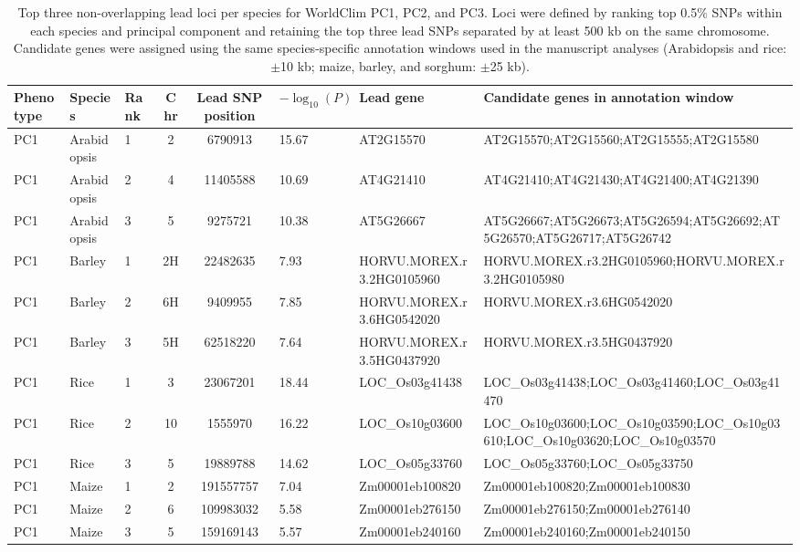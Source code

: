 \begin{table}[t]
\caption{Top three non-overlapping lead loci per species for WorldClim PC1, PC2, and PC3. Loci were defined by ranking top 0.5\% SNPs within each species and principal component and retaining the top three lead SNPs separated by at least 500 kb on the same chromosome. Candidate genes were assigned using the same species-specific annotation windows used in the manuscript analyses (Arabidopsis and rice: $\pm$10 kb; maize, barley, and sorghum: $\pm$25 kb).}
\label{tab:supptable10_worldclim_pc123_top3_loci}
\scriptsize
\tabcolsep=3pt
\begin{tabular*}{\textwidth}{@{\extracolsep{\fill}}lllcclp{3.4cm}p{4.8cm}@{}}
\toprule
Phenotype & Species & Rank & Chr & Lead SNP position & $-\log_{10}(P)$ & Lead gene & Candidate genes in annotation window \\
\midrule
PC1 & Arabidopsis & 1 & 2 & 6790913 & 15.67 & AT2G15570 & AT2G15570;AT2G15560;AT2G15555;AT2G15580 \\
PC1 & Arabidopsis & 2 & 4 & 11405588 & 10.69 & AT4G21410 & AT4G21410;AT4G21430;AT4G21400;AT4G21390 \\
PC1 & Arabidopsis & 3 & 5 & 9275721 & 10.38 & AT5G26667 & AT5G26667;AT5G26673;AT5G26594;AT5G26692;AT5G26570;AT5G26717;AT5G26742 \\
PC1 & Barley & 1 & 2H & 22482635 & 7.93 & HORVU.MOREX.r3.2HG0105960 & HORVU.MOREX.r3.2HG0105960;HORVU.MOREX.r3.2HG0105980 \\
PC1 & Barley & 2 & 6H & 9409955 & 7.85 & HORVU.MOREX.r3.6HG0542020 & HORVU.MOREX.r3.6HG0542020 \\
PC1 & Barley & 3 & 5H & 62518220 & 7.64 & HORVU.MOREX.r3.5HG0437920 & HORVU.MOREX.r3.5HG0437920 \\
PC1 & Rice & 1 & 3 & 23067201 & 18.44 & LOC\_Os03g41438 & LOC\_Os03g41438;LOC\_Os03g41460;LOC\_Os03g41470 \\
PC1 & Rice & 2 & 10 & 1555970 & 16.22 & LOC\_Os10g03600 & LOC\_Os10g03600;LOC\_Os10g03590;LOC\_Os10g03610;LOC\_Os10g03620;LOC\_Os10g03570 \\
PC1 & Rice & 3 & 5 & 19889788 & 14.62 & LOC\_Os05g33760 & LOC\_Os05g33760;LOC\_Os05g33750 \\
PC1 & Maize & 1 & 2 & 191557757 & 7.04 & Zm00001eb100820 & Zm00001eb100820;Zm00001eb100830 \\
PC1 & Maize & 2 & 6 & 109983032 & 5.58 & Zm00001eb276150 & Zm00001eb276150;Zm00001eb276140 \\
PC1 & Maize & 3 & 5 & 159169143 & 5.57 & Zm00001eb240160 & Zm00001eb240160;Zm00001eb240150 \\

\end{tabular*}
\end{table}
